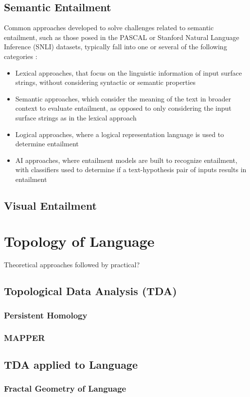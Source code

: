 \documentclass[12pt,twoside]{report}
\begin{document}
\subsection{Semantic Entailment}
Common approaches developed to solve challenges related to semantic entailment, such as those posed in the PASCAL \cite{dagan2006} or Stanford Natural Language Inference (SNLI) \cite{bowman2015} datasets, typically fall into one or several of the following categories \cite{PARAMASIVAM20229644}:
\begin{itemize}
    \item Lexical approaches, that focus on the linguistic information of input surface strings, without considering syntactic or semantic properties
    \item Semantic approaches, which consider the meaning of the text in broader context to evaluate entailment, as opposed to only considering the input surface strings as in the lexical approach
    \item Logical approaches, where a logical representation language is used to determine entailment
    \item AI approaches, where entailment models are built to recognize entailment, with classifiers used to determine if a text-hypothesis pair of inputs results in entailment 
\end{itemize}
\subsection{Visual Entailment}
\section{Topology of Language}
Theoretical approaches followed by  practical?
\subsection{Topological Data Analysis (TDA)}
\subsubsection{Persistent Homology}
\subsubsection{MAPPER}
\subsection{TDA applied to Language}
\subsubsection{Fractal Geometry of Language}
\end{document}
